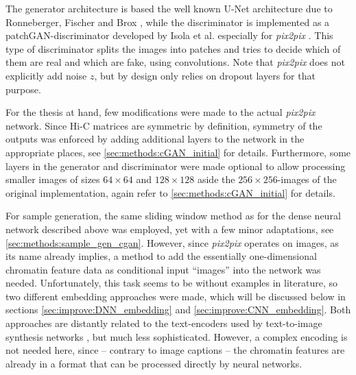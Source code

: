 The generator architecture is based the well known U-Net architecture due to Ronneberger, Fischer and Brox \cite{Ronneberger2015},
while the discriminator is implemented as a patchGAN-discriminator developed by Isola et al. especially for \emph{pix2pix} \cite{Isola2017}.
This type of discriminator splits the images into patches and tries to decide which of them are real and which are fake, using convolutions.
Note that \emph{pix2pix} does not explicitly add noise $z$, but by design only relies on dropout layers for that purpose. 

For the thesis at hand, few modifications were made to the actual \emph{pix2pix} network.
Since Hi-C matrices are symmetric by definition, symmetry of the outputs was enforced
by adding additional layers to the network in the appropriate places, see \cref{sec:methods:cGAN_initial} for details.
Furthermore, some layers in the generator and discriminator were made optional to allow processing smaller images of sizes $64\times64$
and $128\times128$ aside the $256\times256$-images of the original implementation, again refer to \cref{sec:methods:cGAN_initial} for details.

For sample generation, the same sliding window method as for the dense neural network described above was employed, 
yet with a few minor adaptations, see \cref{sec:methods:sample_gen_cgan}.
However, since \emph{pix2pix} operates on images, as its name already implies, 
a method to add the essentially one-dimensional chromatin feature data as conditional input ``images'' into the network was needed.
Unfortunately, this task seems to be without examples in literature, so two different embedding approaches were made,
which will be discussed below in sections \ref{sec:improve:DNN_embedding} and \ref{sec:improve:CNN_embedding}.
Both approaches are distantly related to the text-encoders used by text-to-image synthesis networks 
\cite{Reed2016b,Xu2018}, but much less sophisticated. 
However, a complex encoding is not needed here, since -- contrary to image captions -- the chromatin features are already in a format that can be processed directly by neural networks.


